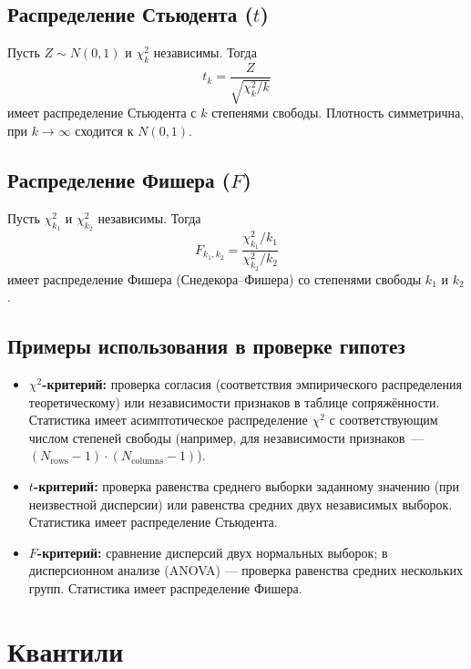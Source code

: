\documentclass[10pt]{article}
\begin{document}
\subsection{Распределение Стьюдента ($t$)}
\begin{definition}
Пусть $Z \sim N(0,1)$ и $\chi^2_k$ независимы. Тогда
\[
t_k = \frac{Z}{\sqrt{\chi^2_k / k}}
\]
имеет распределение Стьюдента с $k$ степенями свободы. Плотность симметрична, при $k \to \infty$ сходится к $N(0,1)$.
\end{definition}

\subsection{Распределение Фишера ($F$)}
\begin{definition}
Пусть $\chi^2_{k_1}$ и $\chi^2_{k_2}$ независимы. Тогда
\[
F_{k_1, k_2} = \frac{\chi^2_{k_1} / k_1}{\chi^2_{k_2} / k_2}
\]
имеет распределение Фишера (Снедекора–Фишера) со степенями свободы $k_1$ и $k_2$.
\end{definition}

\subsection*{Примеры использования в проверке гипотез}
\begin{itemize}
    \item \textbf{$\chi^2$-критерий:} проверка согласия (соответствия эмпирического распределения теоретическому) или независимости признаков в таблице сопряжённости. Статистика имеет асимптотическое распределение $\chi^2$ с соответствующим числом степеней свободы (например, для независимости признаков~--- $(N_{\operatorname{rows}} - 1) \cdot (N_{\operatorname{columns}} - 1)$).
    \item \textbf{$t$-критерий:} проверка равенства среднего выборки заданному значению (при неизвестной дисперсии) или равенства средних двух независимых выборок. Статистика имеет распределение Стьюдента.
    \item \textbf{$F$-критерий:} сравнение дисперсий двух нормальных выборок; в дисперсионном анализе (ANOVA) — проверка равенства средних нескольких групп. Статистика имеет распределение Фишера.
\end{itemize}

\section{Квантили}
\end{document}
